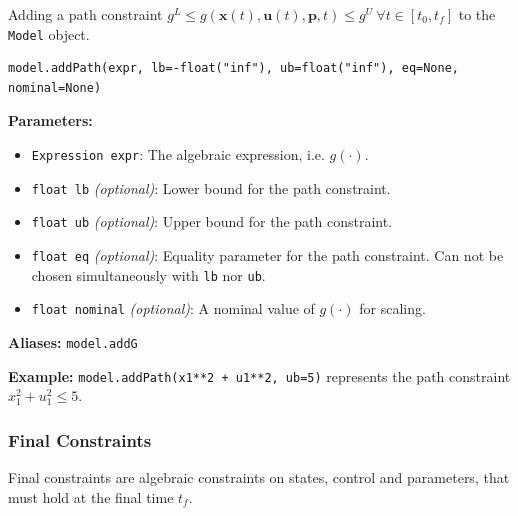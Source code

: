 \documentclass[12pt]{article}
\renewcommand{\v}{\bm}
\begin{document}
\begin{mdframed}[backgroundcolor=gray!10, roundcorner=10pt,
		linewidth=1pt]

	Adding a path constraint ${g}^{L} \leq {g}(\v{x}(t), \v{u}(t),
		\v{p}, t) \leq {g}^{U}\ \forall t \in [t_0, t_f]$ to the
	\texttt{Model} object.

	\begin{lstlisting}
model.addPath(expr, lb=-float("inf"), ub=float("inf"), eq=None, nominal=None)
		\end{lstlisting}
	\label{addPath}
	\textbf{Parameters:}
	\begin{itemize}
		\item \texttt{Expression expr}: The algebraic
		      expression, i.e. $g(\cdot)$.
		\item \texttt{float lb} \emph{(optional)}: Lower bound
		      for the path constraint.
		\item \texttt{float ub} \emph{(optional)}: Upper bound
		      for the path constraint.
		\item \texttt{float eq} \emph{(optional)}: Equality
		      parameter for the path constraint. Can not be chosen
		      simultaneously with
		      \texttt{lb} nor \texttt{ub}.
		\item \texttt{float nominal} \emph{(optional)}: A
		      nominal value of $g(\cdot)$ for scaling.
	\end{itemize}

	\textbf{Aliases:}  \texttt{model.addG}

	\textbf{Example:} \texttt{model.addPath(x1**2 + u1**2, ub=5)}
	represents the path constraint
	$x_1^2 + u_1^2 \leq 5$.
\end{mdframed}

\subsubsection{Final Constraints}

Final constraints are algebraic constraints on states, control and
parameters, that must hold at the final time $t_f$.
\end{document}
